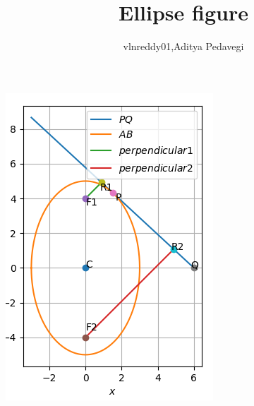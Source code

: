 \documentclass{article}
\begin{document}
\title{Ellipse figure}
\author{vlnreddy01,Aditya Pedavegi}
\maketitle
\includegraphics[scale = 1.25]{ellipse_plot.png}
\end{document}
